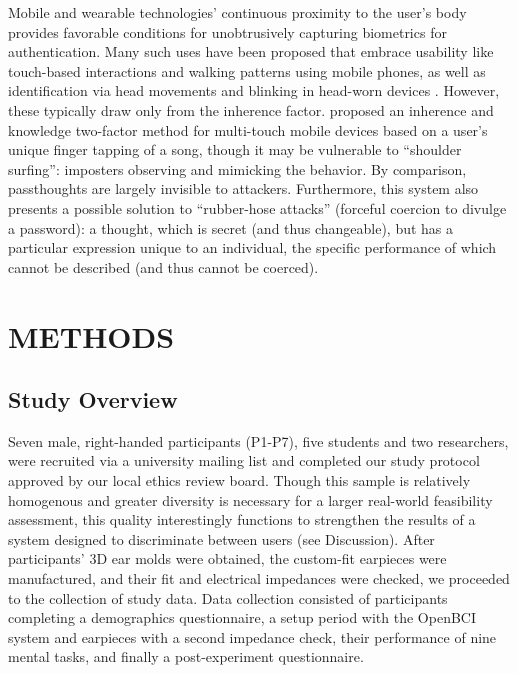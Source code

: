 \documentclass[a4paper,twoside]{article}
\begin{document}
Mobile and wearable technologies' continuous proximity to the user's body provides favorable conditions for unobtrusively capturing biometrics for authentication. Many such uses have been proposed that embrace usability like touch-based interactions \cite{Tartz2015,Holz2015} and walking patterns \cite{Lu2014} using mobile phones, as well as identification via head movements and blinking in head-worn devices \cite{Rogers2015}. However, these typically draw only from the inherence factor. \cite{Chen2015} proposed an inherence and knowledge two-factor method for multi-touch mobile devices based on a user's unique finger tapping of a song, though it may be vulnerable to ``shoulder surfing'': imposters observing and mimicking the behavior. By comparison, passthoughts are largely invisible to attackers. Furthermore, this system also presents a possible solution to ``rubber-hose attacks'' (forceful coercion to divulge a password): a thought, which is secret (and thus changeable), but has a particular expression unique to an individual, the specific performance of which cannot be described (and thus cannot be coerced).

\section{\uppercase{Methods}}
\label{sec:methods}

\subsection{Study Overview}

\noindent Seven male, right-handed participants (P1-P7), five students and two researchers, were recruited via a university mailing list and completed our study protocol approved by our local ethics review board. Though this sample is relatively homogenous and greater diversity is necessary for a larger real-world feasibility assessment, this quality interestingly functions to strengthen the results of a system designed to discriminate between users (see Discussion). After participants' 3D ear molds were obtained, the custom-fit earpieces were manufactured, and their fit and electrical impedances were checked, we proceeded to the collection of study data.
Data collection consisted of participants completing a demographics questionnaire, a setup period with the OpenBCI system and earpieces with a second impedance check, their performance of nine mental tasks, and finally a post-experiment questionnaire.
\end{document}
